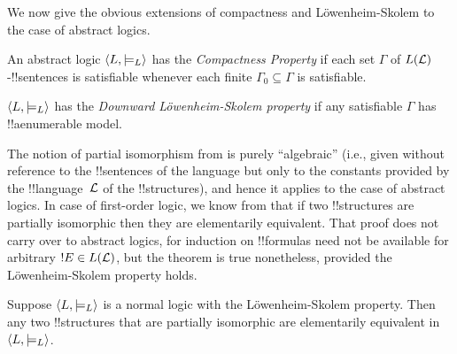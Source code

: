 \documentclass[../../../include/open-logic-section]{subfiles}
\begin{document}


We now give the obvious extensions of compactness and
L\"owenheim-Skolem to the case of abstract logics. 

\begin{defn}
An abstract logic $\langle L, \models_L \rangle$ has the \emph{Compactness
  Property} if each set $\Gamma$ of $L(\mathcal L)$-!!{sentence}s is
satisfiable whenever each finite $\Gamma_0 \subseteq \Gamma$ is
satisfiable.
\end{defn}

\begin{defn}
$\langle L, \models_L \rangle$ has the \emph{Downward L\"owenheim-Skolem
  property} if any satisfiable $\Gamma$ has !!a{enumerable} model.
\end{defn}


The notion of partial isomorphism from
 is purely ``algebraic'' (i.e.,
given without reference to the !!{sentence}s of the language but only
to the constants provided by the !!{language}~$\mathcal L$ of the
!!{structure}s), and hence it applies to the case of abstract
logics. In case of first-order logic, we know from
 that if two !!{structure}s are partially
isomorphic then they are elementarily equivalent. That proof does not
carry over to abstract logics, for induction on !!{formula}s need not
be available for arbitrary $!E \in L(\mathcal L)$, but the theorem is
true nonetheless, provided the L\"owenheim-Skolem property holds.

\begin{thm}
Suppose $\langle L, \models_L \rangle$ is a normal logic with the
L\"owenheim-Skolem property. Then any two !!{structure}s that are
partially isomorphic are elementarily equivalent in $\langle L,
  \models_L \rangle$.
\end{thm}
\end{document}
